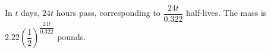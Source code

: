 In $t$ days, $24t$ hours pass, corresponding to $\dfrac{24t}{0.322}$ half-lives. The mass is $\boxed{2.22\left(\dfrac{1}{2}\right)^{\dfrac{24t}{0.322}}}$ pounds.
